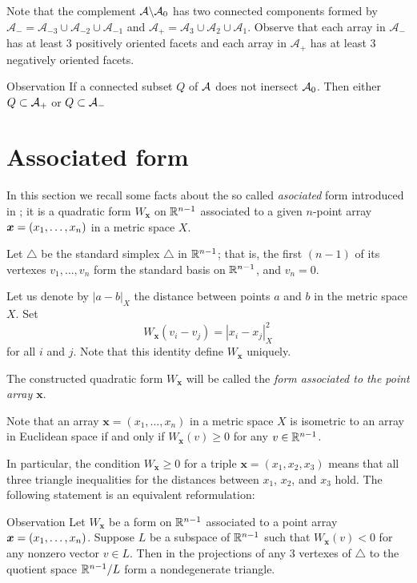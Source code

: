 \documentclass{article}
\begin{document}
Note that the complement $\mathcal{A}\backslash \mathcal{A}_0$ has two connected components formed by $\mathcal{A}_{-}=\mathcal{A}_{-3}\cup \mathcal{A}_{-2}\cup\mathcal{A}_{-1}$ and $\mathcal{A}_{+}=\mathcal{A}_{3}\cup \mathcal{A}_{2}\cup\mathcal{A}_{1}$.
Observe that each array in $\mathcal{A}_{-}$ has at least 3 positively oriented facets and each array in $\mathcal{A}_{+}$ has at least 3 negatively oriented facets.

\begin{thm}{Observation}\label{obs:connectedA}
If a connected subset $Q$ of $\mathcal{A}$ does not inersect $\mathcal{A}_0$.
Then either $Q\subset \mathcal{A}_+$ or $Q\subset \mathcal{A}_-$
\end{thm}


\section{Associated form}

In this section we recall some facts about the so called \emph{asociated} form introduced in \cite{petrunin-2017};
it is a quadratic form 
$W_{\bm{x}}$ on $\mathbb{R}^{n-1}$ associated
to a given $n$-point array $\bm{x}\z=(x_1,\dots,x_n)$ in a metric space $X$.

Let $\triangle$ be the standard simplex $\triangle$ in $\mathbb{R}^{n-1}$; that is, the first $(n-1)$ of its vertexes $v_1,\dots,v_n$ form the standard basis on $\mathbb{R}^{n-1}$,
 and $v_n=0$.

Let us denote by $|a-b|_X$ the distance between points $a$ and $b$ in the metric space $X$.
Set
\[W_{\bm{x}}(v_i-v_j)=|x_i-x_j|^2_X\] 
for all $i$ and $j$.
Note that this identity define $W_{\bm{x}}$ uniquely.


The constructed quadratic form $W_{\bm{x}}$ will be called the \emph{form associated to the point array $\bm{x}$}.

Note that an array $\bm{x}=(x_1,\dots,x_n)$ in a metric space $X$ is isometric to an array in Euclidean space if and only if 
$W_{\bm{x}}(v)\ge 0$
for any $v\in \mathbb{R}^{n-1}$.

In particular,  the
condition $W_{\bm{x}}\ge 0$ for a triple $\bm{x}=(x_1,x_2,x_3)$ means that 
all three triangle inequalities for the distances between $x_1$, $x_2$, and $x_3$ hold.
The following statement is an equivalent reformulation:

\begin{thm}{Observation}\label{triangle-inq}
Let $W_{\bm{x}}$ be a form on $\mathbb{R}^{n-1}$ associated to a point array $\bm{x}\z=(x_1,\dots,x_n)$.
Suppose $L$ be a subspace of $\mathbb{R}^{n-1}$ such that
$W_{\bm{x}}(v)< 0$ for any nonzero vector $v\in L$.
Then in the projections of any 3 vertexes of $\triangle$ to the quotient space $\mathbb{R}^{n-1}/L$ form a nondegenerate triangle.
\end{thm}
\end{document}
